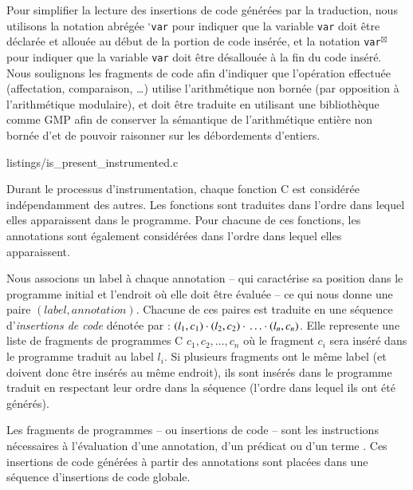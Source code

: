 Pour simplifier la lecture des insertions de code générées par la traduction,
nous utilisons la notation abrégée ${}^{\square}$\lstinline{var} pour indiquer
que la variable \lstinline{var} doit être déclarée et allouée 
au début de la portion de code insérée, et la notation
\lstinline{var}${}^{\boxtimes}$ pour indiquer que la variable \lstinline{var} doit
être désallouée
à la fin du code inséré.
Nous soulignons les fragments de code afin d'indiquer que l'opération effectuée
(affectation, comparaison, \dots) utilise l'arithmétique non bornée (par
opposition à l'arithmétique modulaire), et doit être traduite en utilisant une
bibliothèque comme GMP afin de conserver la sémantique de l'arithmétique entière
non bornée d'\eacsl et de pouvoir raisonner sur les débordements d'entiers.



                {listings/is_present_instrumented.c}


Durant le processus d'instrumentation, chaque fonction C est considérée
indépendamment des autres.
Les fonctions sont traduites dans l'ordre dans lequel elles apparaissent dans le
programme.
Pour chacune de ces fonctions, les annotations \eacsl sont également considérées
dans l'ordre dans lequel elles apparaissent.

Nous associons un label à chaque annotation -- qui caractérise sa position dans
le programme initial et l'endroit où elle doit être évaluée -- ce qui nous
donne une paire $(label, annotation)$.
Chacune de ces paires est traduite en une séquence
d'\emph{insertions de code} dénotée par :
$(l_1, c_1) \cdot{} (l_2, c_2) \cdot{} \ldots \cdot{} (l_n, c_n)$.
Elle represente une liste de fragments de programmes C $c_1, c_2, \ldots, c_n$
où le fragment $c_i$ sera inséré dans le programme traduit au label $l_i$.
Si plusieurs fragments ont le même label (et doivent donc être insérés au
même endroit), ils sont insérés dans le programme traduit en respectant leur
ordre dans la séquence (l'ordre dans lequel ils ont été générés).


Les fragments de programmes -- ou insertions de code -- sont les instructions
nécessaires à l'évaluation d'une annotation, d'un prédicat ou d'un terme
\eacsl.
Ces insertions de code générées à partir des annotations sont placées
dans une séquence d'insertions de code globale.

